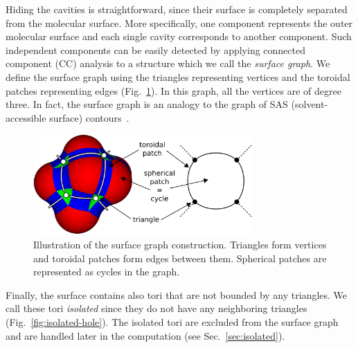 


Hiding the cavities is straightforward, since their surface is completely separated from the molecular surface.
More specifically, one component represents the outer molecular surface and each single cavity corresponds to another component.
Such independent components can be easily detected by applying connected component (CC) analysis to a structure which we call the \textit{surface graph}.
We define the surface graph using the triangles representing vertices and the toroidal patches representing edges 
(Fig.~\ref{fig:graph}).
In this graph, all the vertices are of degree three.
In fact, the surface graph is an analogy to the graph of SAS (solvent-accessible surface) contours~\cite{totrov1996contour}.

\begin{figure}[bht]
  \centering
  \includegraphics[width=3.3in]{image/graph.png}
  \caption{Illustration of the surface graph construction.
	Triangles form vertices and toroidal patches form edges between them.
	Spherical patches are represented as cycles in the graph.}
	\label{fig:graph}
\end{figure}

Finally, the surface contains also tori that are not bounded by any triangles.
We call these tori \textit{isolated} since they do not have any neighboring triangles (Fig.~\ref{fig:isolated-hole}).
The isolated tori are excluded from the surface graph and are handled later in the computation (see Sec.~\ref{sec:isolated}).

